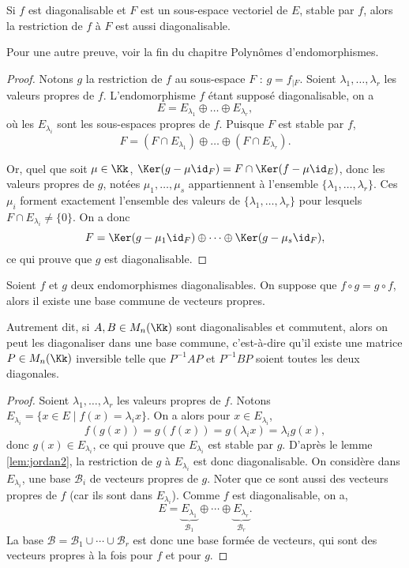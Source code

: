 \documentclass[12pt, class=report,crop=false]{standalone}
\begin{document}
\begin{lemme}
\label{lem:jordan2}
Si $f$ est diagonalisable et $F$ est un sous-espace vectoriel de $E$, stable par $f$, alors la restriction 
de $f$ à $F$ est aussi diagonalisable.
\end{lemme}

Pour une autre preuve, voir la fin du chapitre \og{}Polynômes d'endomorphismes\fg{}.

\begin{proof}
Notons $g$ la restriction de $f$ au sous-espace $F$ : $g=f_{|F}$. Soient $\lambda_1,\dots,\lambda_r$ les valeurs propres de $f$. 
L'endomorphisme $f$ étant supposé diagonalisable, on a 
$$E=E_{\lambda_1}\oplus\dots\oplus E_{\lambda_r},$$
où les $E_{\lambda_i}$ sont les sous-espaces propres de $f$. 
Puisque $F$ est stable par $f$,
$$F = (F\cap E_{\lambda_1})\oplus\dots\oplus (F\cap E_{\lambda_r}).$$

Or, quel que soit $\mu\in\Kk$, $\Ker(g-\mu\id_F)=F\cap\Ker(f-\mu\id_E)$,
donc les valeurs propres de $g$, notées $\mu_1,\dots,\mu_s$ appartiennent à l'ensemble 
$\{\lambda_1,\dots,\lambda_r\}$. 
Ces $\mu_i$ forment exactement l'ensemble des valeurs de $\{\lambda_1,\dots,\lambda_r\}$ pour lesquels $F\cap E_{\lambda_i} \neq \{0\}$.
On a donc 
$$F= \Ker(g-\mu_1\id_F)\oplus \cdots \oplus \Ker(g-\mu_s\id_F),$$
ce qui prouve que $g$ est diagonalisable.
\end{proof}


\begin{lemme}
\label{lem:jordan3}
Soient $f$ et $g$ deux endomorphismes diagonalisables. On suppose que 
$f\circ g=g\circ f$, alors il existe une base commune de vecteurs propres. 
\end{lemme}

Autrement dit, si $A,B \in M_n(\Kk)$ sont diagonalisables et commutent, alors on peut les diagonaliser dans  une base commune, c'est-à-dire qu'il existe une matrice $P \in M_n(\Kk)$ inversible telle que $P^{-1}AP$ et $P^{-1}BP$ soient toutes les deux diagonales.


\begin{proof}
Soient $\lambda_1,\dots,\lambda_r$ les valeurs propres de $f$. Notons 
$E_{\lambda_i} = \{x\in E \mid f(x)=\lambda_i x\}$. 
On a alors pour $x\in E_{\lambda_i}$,
$$f(g(x))=g(f(x))=g(\lambda_i x)=\lambda_i g(x),$$
donc $g(x)\in E_{\lambda_i}$, ce qui prouve que $E_{\lambda_i}$ est stable par $g$.
D'après le lemme \ref{lem:jordan2}, la restriction de $g$ à $E_{\lambda_i}$ est donc diagonalisable. On considère dans $E_{\lambda_i}$, une base $\mathcal{B}_i$ de vecteurs propres de $g$. Noter que ce sont aussi des vecteurs propres de $f$ (car ils sont dans $E_{\lambda_i}$).
Comme $f$ est diagonalisable, on a, 
$$E=\underbrace{E_{\lambda_1}}_{\mathcal{B}_1}\oplus\cdots\oplus\underbrace{E_{\lambda_r}}_{\mathcal{B}_r}.$$
La base $\mathcal{B}=\mathcal{B}_1\cup\cdots\cup\mathcal{B}_r$ est donc une base formée de vecteurs, qui sont des vecteurs propres à la fois pour $f$ et pour $g$.
\end{proof}
\end{document}
